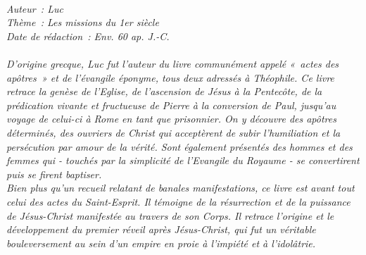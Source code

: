 \BFont
\noindent\hrulefill
{\footnotesize
\textit{
\bigskip
{\centering{}
\\Auteur~: Luc
\\Thème~: Les missions du 1er siècle
\\Date de rédaction~: Env. 60 ap. J.-C.\\}
}
\textit{
\\D'origine grecque, Luc fut l'auteur du livre communément appelé «~actes des apôtres~» et de l'évangile éponyme, tous deux adressés à Théophile. Ce livre retrace la genèse de l'Eglise, de l'ascension de Jésus à la Pentecôte, de la prédication vivante et fructueuse de Pierre à la conversion de Paul, jusqu'au voyage de celui-ci à Rome en tant que prisonnier. On y découvre des apôtres déterminés, des ouvriers de Christ qui acceptèrent de subir l'humiliation et la persécution par amour de la vérité. Sont également présentés des hommes et des femmes qui - touchés par la simplicité de l'Evangile du Royaume - se convertirent puis se firent baptiser.
\\Bien plus qu'un recueil relatant de banales manifestations, ce livre est avant tout celui des actes du Saint-Esprit. Il témoigne de la résurrection et de la puissance de Jésus-Christ manifestée au travers de son Corps. Il retrace l'origine et le développement du premier réveil après Jésus-Christ, qui fut un véritable bouleversement au sein d'un empire en proie à l'impiété et à l'idolâtrie.\bigskip
}
}
\par\nobreak\noindent\hrulefill

